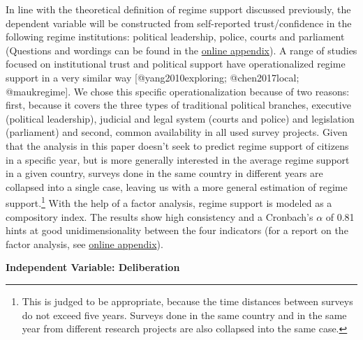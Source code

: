 \documentclass[]{article}
\let\rmarkdownfootnote\footnote%
\def\footnote{\protect\rmarkdownfootnote}
\begin{document}
In line with the theoretical definition of regime support discussed
previously, the dependent variable will be constructed from
self-reported trust/confidence in the following regime institutions:
political leadership, police, courts and parliament (Questions and
wordings can be found in the
\href{https://favstats.github.io/delib_mod_database/\#operationalization-regime-support}{online
appendix}). A range of studies focused on institutional trust and
political support have operationalized regime support in a very similar
way {[}@yang2010exploring; @chen2017local; @maukregime{]}. We chose this
specific operationalization because of two reasons: first, because it
covers the three types of traditional political branches, executive
(political leadership), judicial and legal system (courts and police)
and legislation (parliament) and second, common availability in all used
survey projects. Given that the analysis in this paper doesn't seek to
predict regime support of citizens in a specific year, but is more
generally interested in the average regime support in a given country,
surveys done in the same country in different years are collapsed into a
single case, leaving us with a more general estimation of regime
support.\footnote{This is judged to be appropriate, because the time distances between surveys do not exceed five years. Surveys done in the same country and in the same year from different research projects are also collapsed into the same case.}
With the help of a factor analysis, regime support is modeled as a
compository index. The results show high consistency and a Cronbach's
\(\alpha\) of 0.81 hints at good unidimensionality between the four
indicators (for a report on the factor analysis, see
\href{https://favstats.github.io/delib_mod_database/\#operationalization-regime-support}{online
appendix}).

\begin{footnotesize}
\noindent \textbf{Independent Variable: Deliberation}
\end{footnotesize}
\end{document}
